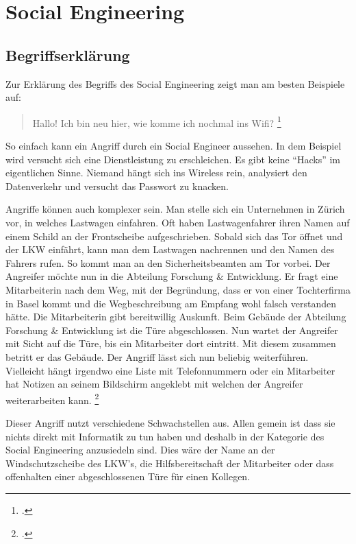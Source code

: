 \setcounter{secnumdepth}{3}
\chapter{Social Engineering}
\label{sec:socialengineering}

\section{Begriffserklärung}
\label{sec:socialengineering:begriffserklaerung}
Zur Erklärung des Begriffs des Social Engineering zeigt man am besten Beispiele auf:

\begin{quote}
	Hallo! Ich bin neu hier, wie komme ich nochmal ins Wifi? \footcite{Social_Engineering_Wenn_die_Gefahr_im_Anzug_kommt__t3n_2015-04-26}
\end{quote}

So einfach kann ein Angriff durch ein Social Engineer aussehen. In dem Beispiel wird versucht sich eine Dienstleistung zu erschleichen. Es gibt keine "`Hacks"' im eigentlichen Sinne. Niemand hängt sich ins Wireless rein, analysiert den Datenverkehr und versucht das Passwort zu knacken.

Angriffe können auch komplexer sein. Man stelle sich ein Unternehmen in Zürich vor, in welches Lastwagen einfahren. Oft haben Lastwagenfahrer ihren Namen auf einem Schild an der Frontscheibe aufgeschrieben. Sobald sich das Tor öffnet und der LKW einfährt, kann man dem Lastwagen nachrennen und den Namen des Fahrers rufen. So kommt man an den Sicherheitsbeamten am Tor vorbei. 
Der Angreifer möchte nun in die Abteilung Forschung \& Entwicklung. Er fragt eine Mitarbeiterin nach dem Weg, mit der Begründung, dass er von einer Tochterfirma in Basel kommt und die Wegbeschreibung am Empfang wohl falsch verstanden hätte. Die Mitarbeiterin gibt bereitwillig Auskunft.
Beim Gebäude der Abteilung Forschung \& Entwicklung ist die Türe abgeschlossen. Nun wartet der Angreifer mit Sicht auf die Türe, bis ein Mitarbeiter dort eintritt. Mit diesem zusammen betritt er das Gebäude. 
Der Angriff lässt sich nun beliebig weiterführen. Vielleicht hängt irgendwo eine Liste mit Telefonnummern oder ein Mitarbeiter hat Notizen an seinem Bildschirm angeklebt mit welchen der Angreifer weiterarbeiten kann. \footcite{Beispiel_fr_einen_Social_Engineering_Angriff_Social_Engineering_-_Manipulation_2015-04-26}

Dieser Angriff nutzt verschiedene Schwachstellen aus. Allen gemein ist dass sie nichts direkt mit Informatik zu tun haben und deshalb in der Kategorie des Social Engineering anzusiedeln sind. Dies wäre der Name an der Windschutzscheibe des LKW's, die Hilfsbereitschaft der Mitarbeiter oder dass offenhalten einer abgeschlossenen Türe für einen Kollegen.

